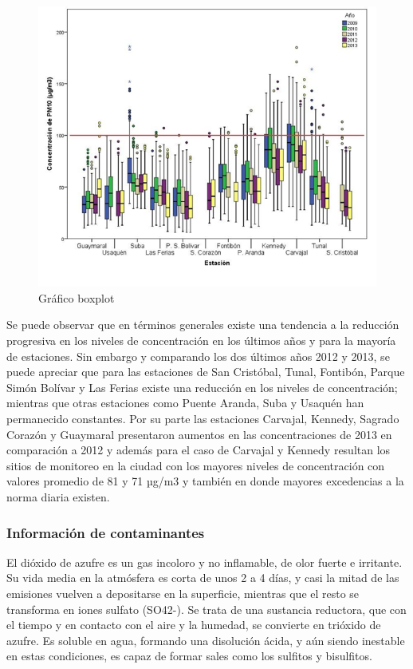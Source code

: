 \begin{figure}[h]
	\centering
	\includegraphics[scale=0.8]{images/BoxPlot.png}
	\caption{Gráfico boxplot}
\end{figure}

Se puede observar que en términos generales existe una tendencia a la reducción progresiva en los niveles de concentración en los últimos años y para la mayoría de estaciones. Sin embargo y comparando los dos últimos años 2012 y 2013, se puede apreciar que  para las estaciones de San Cristóbal, Tunal, Fontibón, Parque Simón Bolívar y Las Ferias existe una reducción en los niveles de concentración; mientras que otras estaciones como Puente Aranda, Suba y Usaquén han permanecido constantes.
Por su parte las estaciones Carvajal, Kennedy, Sagrado Corazón y Guaymaral presentaron aumentos en las concentraciones de 2013 en comparación a 2012 y además para el caso de Carvajal y Kennedy resultan los sitios de monitoreo en la ciudad con los mayores niveles de concentración con valores promedio de 81 y 71 µg/m3 y también en donde mayores excedencias a la norma diaria existen.

\subsubsection{Información de contaminantes}

El dióxido de azufre es un gas incoloro y no inflamable, de olor fuerte e irritante. Su vida media en la atmósfera es corta de unos 2 a 4 días, y casi la mitad de las emisiones vuelven a depositarse en la superficie, mientras que el resto se transforma en iones sulfato (SO42-). Se trata de una sustancia reductora, que con el tiempo y en contacto con el aire y la humedad, se convierte en trióxido de azufre. Es soluble en agua, formando una disolución ácida, y aún siendo inestable en estas condiciones, es capaz de formar sales como los sulfitos y bisulfitos.


